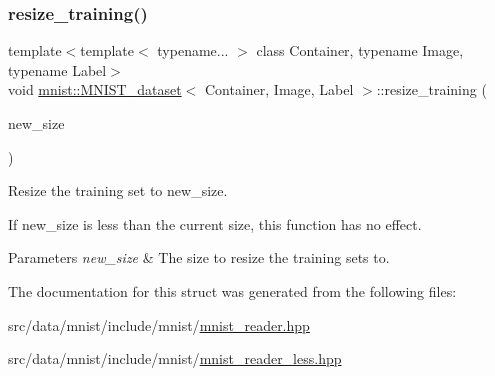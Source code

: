 \subsubsection{\texorpdfstring{resize\+\_\+training()}{resize\_training()}}
{\footnotesize\ttfamily template$<$template$<$ typename... $>$ class Container, typename Image, typename Label$>$ \\
void \hyperlink{structmnist_1_1MNIST__dataset}{mnist\+::\+M\+N\+I\+S\+T\+\_\+dataset}$<$ Container, Image, Label $>$\+::resize\+\_\+training (\begin{DoxyParamCaption}\item[{std\+::size\+\_\+t}]{new\+\_\+size }\end{DoxyParamCaption})\hspace{0.3cm}{\ttfamily [inline]}}



Resize the training set to new\+\_\+size. 

If new\+\_\+size is less than the current size, this function has no effect.


\begin{DoxyParams}{Parameters}
{\em new\+\_\+size} & The size to resize the training sets to. \\
\hline
\end{DoxyParams}


The documentation for this struct was generated from the following files\+:\begin{DoxyCompactItemize}
\item 
src/data/mnist/include/mnist/\hyperlink{mnist__reader_8hpp}{mnist\+\_\+reader.\+hpp}\item 
src/data/mnist/include/mnist/\hyperlink{mnist__reader__less_8hpp}{mnist\+\_\+reader\+\_\+less.\+hpp}\end{DoxyCompactItemize}
